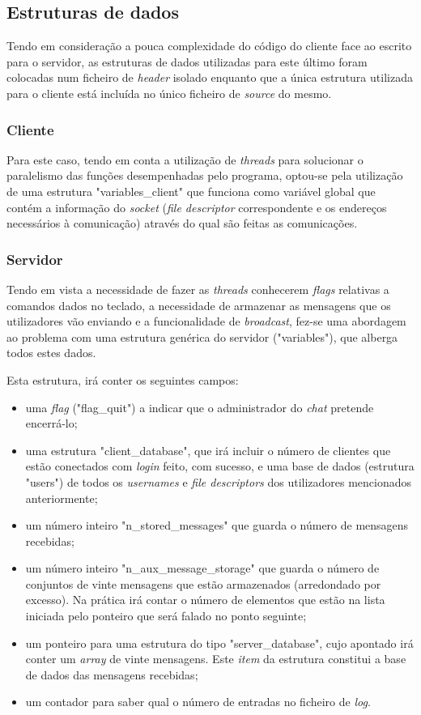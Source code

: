 \documentclass[a4paper]{article}
\begin{document}
\subsection{Estruturas de dados}
Tendo em consideração a pouca complexidade do código do cliente face ao escrito para o servidor, as estruturas de dados utilizadas para este último foram colocadas num ficheiro de \textit{header} isolado enquanto que a única estrutura utilizada para o cliente está incluída no único ficheiro de \textit{source} do mesmo.

\subsubsection{Cliente}
Para este caso, tendo em conta a utilização de \textit{threads} para solucionar o paralelismo das funções desempenhadas pelo programa, optou-se pela utilização de uma estrutura "variables\_client" que funciona como variável global que contém a informação do \textit{socket} (\textit{file descriptor} correspondente e os endereços necessários à comunicação) através do qual são feitas as comunicações.

\subsubsection{Servidor}

Tendo em vista a necessidade de fazer as \textit{threads} conhecerem \textit{flags} relativas a comandos dados no teclado, a necessidade de armazenar as mensagens que os utilizadores vão enviando e a funcionalidade de \textit{broadcast}, fez-se uma abordagem ao problema com uma estrutura genérica do servidor ("variables"), que alberga todos estes dados.

Esta estrutura, irá conter os seguintes campos:
\begin{itemize}
  \item uma \textit{flag} ("flag\_quit") a indicar que o administrador do \textit{chat} pretende encerrá-lo;
  \item uma estrutura "client\_database", que irá incluir o número de clientes que estão conectados com \textit{login} feito, com sucesso, e uma base de dados (estrutura "users") de todos os \textit{usernames} e \textit{file descriptors} dos utilizadores mencionados anteriormente;
  \item um número inteiro "n\_stored\_messages" que guarda o número de mensagens recebidas;
  \item um número inteiro "n\_aux\_message\_storage" que guarda o número de conjuntos de vinte mensagens que estão armazenados (arredondado por excesso). Na prática irá contar o número de elementos que estão na lista iniciada pelo ponteiro que será falado no ponto seguinte;
  \item um ponteiro para uma estrutura do tipo "server\_database", cujo apontado irá conter um \textit{array} de vinte mensagens. Este \textit{item} da estrutura constitui a base de dados das mensagens recebidas;
  \item um contador para saber qual o número de entradas no ficheiro de \textit{log}.
\end{itemize}
\end{document}
